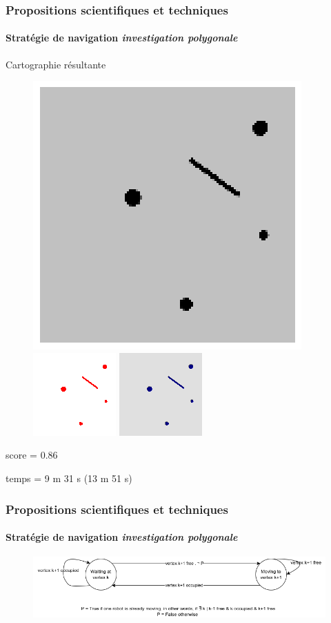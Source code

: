 \documentclass{beamer}
\begin{document}
			\begin{frame}
				\frametitle{Propositions scientifiques et techniques}
				\framesubtitle{Stratégie de navigation \textit{investigation polygonale}}
				Cartographie résultante
				\begin{figure}
					\centering
					\includegraphics[width=0.3\linewidth]{graphics/test_05_flip.png}
					\includegraphics[width=0.3\linewidth]{graphics/occupancy_grid_example_ip.png}
					\includegraphics[width=0.3\linewidth]{graphics/both_example_ip.png}
				\end{figure}
				score = 0.86

				temps = 9 m 31 s (13 m 51 s)
			\end{frame}
			\begin{frame}
				\frametitle{Propositions scientifiques et techniques}
				\framesubtitle{Stratégie de navigation \textit{investigation polygonale}}
				\begin{figure}
					\centering
					\includegraphics[width=1.0\textwidth]{graphics/automat_poly.png}
				\end{figure}
			\end{frame}
\end{document}
